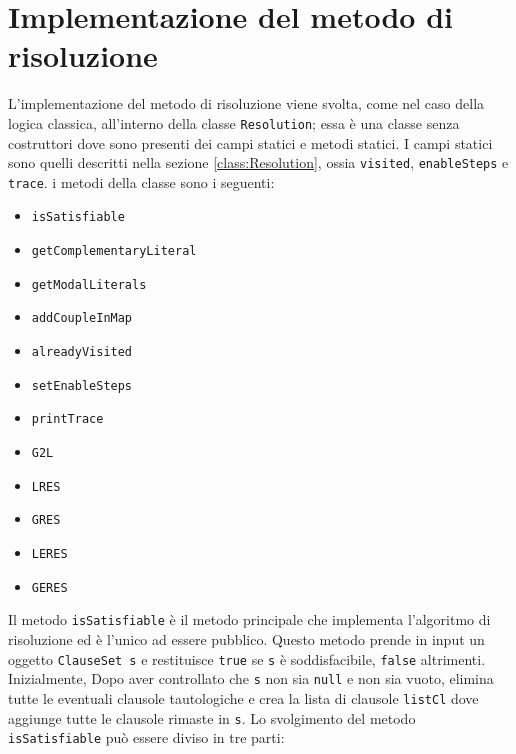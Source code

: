 \documentclass[a4paper,12pt]{report}
\begin{document}
\section{Implementazione del metodo di risoluzione}
\label{impl_res_modal}
L'implementazione del metodo di risoluzione viene svolta, come nel caso della logica classica, all'interno della classe \texttt{Resolution}; essa è una classe senza costruttori dove sono presenti dei campi statici e metodi statici. I campi statici sono quelli descritti nella sezione \ref{class:Resolution}, ossia \texttt{visited}, \texttt{enableSteps} e \texttt{trace}. i metodi della classe sono i seguenti:
\begin{itemize}
    \item \texttt{isSatisfiable}
    \item \texttt{getComplementaryLiteral}
    \item \texttt{getModalLiterals}
    \item \texttt{addCoupleInMap}
    \item \texttt{alreadyVisited}
    \item \texttt{setEnableSteps}
    \item \texttt{printTrace}
    \item \texttt{G2L}
    \item \texttt{LRES}
    \item \texttt{GRES}
    \item \texttt{LERES}
    \item \texttt{GERES}
\end{itemize}
Il metodo \texttt{isSatisfiable} è il metodo principale che implementa l'algoritmo di risoluzione ed è l'unico ad essere pubblico. Questo metodo prende in input un oggetto \texttt{ClauseSet s} e restituisce \texttt{true} se \texttt{s} è soddisfacibile, \texttt{false} altrimenti. Inizialmente, Dopo aver controllato che \texttt{s} non sia \texttt{null} e non sia vuoto, elimina tutte le eventuali clausole tautologiche e crea la lista di clausole \texttt{listCl} dove aggiunge tutte le clausole rimaste in \texttt{s}. Lo svolgimento del metodo \texttt{isSatisfiable} può essere diviso in tre parti:
\end{document}

